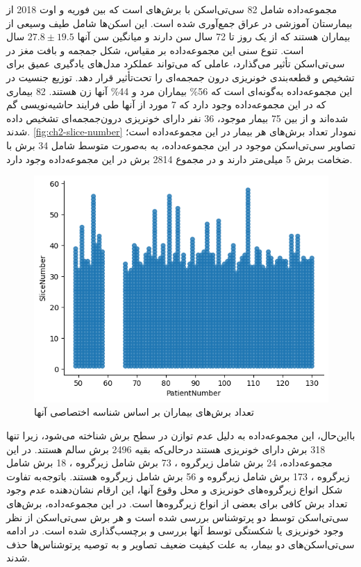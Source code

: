مجموعه‌داده 
 شامل 82 سی‌تی‌اسکن با برش‌‌های 
است که بین فوریه و اوت 2018 از بیمارستان آموزشی 
 در عراق جمع‌آوری شده است. این اسکن‌ها شامل طیف وسیعی از بیماران هستند که از یک روز تا 72 سال سن دارند و میانگین سن آنها 
 $27.8 \pm 19.5$
 سال است. تنوع سنی این مجموعه‌داده بر مقیاس، شکل جمجمه و بافت مغز در سی‌تی‌اسکن تأثیر می‌گذارد، عاملی که می‌تواند عملکرد مدل‌های یادگیری عمیق برای تشخیص و قطعه‌بندی خونریزی درون جمجمه‌ای را تحت‌تأثیر قرار دهد. توزیع جنسیت در این مجموعه‌داده به‌گونه‌ای است که 56\%  بیماران مرد و 44\% آنها زن هستند.
82 بیماری که در این مجموعه‌داده وجود دارد که 7 مورد از آنها طی فرایند حاشیه‌نویسی گم شده‌اند و از بین 75 بیمار موجود، 36 نفر دارای خونریزی درون‌جمجمه‌ای تشخیص داده شدند.
\autoref{fig:ch2-slice-number}
نمودار تعداد برش‌های هر بیمار در این مجموعه‌داده است؛ تصاویر سی‌تی‌اسکن موجود در این مجموعه‌داده،  به به‌صورت متوسط شامل 34 برش با ضخامت برش 5 میلی‌متر دارند و در مجموع 2814 برش در این مجموعه‌داده وجود دارد. 
\begin{figure}[h]
\centering
\includegraphics[width=1.0\linewidth]{"Images/Chapter2/Slice number"}
\caption{‌تعداد برش‌های بیماران بر اساس شناسه اختصاصی آنها}
\label{fig:ch2-slice-number}
\end{figure}

بااین‌حال، این مجموعه‌داده به دلیل عدم توازن در سطح برش شناخته می‌شود، زیرا تنها 318 برش دارای خونریزی هستند درحالی‌که  بقیه 2496 برش سالم هستند. در این مجموعه‌داده، 24 برش شامل زیرگروه
 ،
  73 برش شامل زیرگروه
 ، 
  18 برش شامل زیرگروه
 ،
173 برش شامل زیرگروه
 و 56 برش شامل زیرگروه 
هستند. باتوجه‌به تفاوت شکل انواع زیرگروه‌های خونریزی و محل وقوع آنها، این ارقام نشان‌دهنده عدم وجود تعداد برش کافی برای بعضی از انواع زیرگروه‌ها است.
در این مجموعه‌داده، برش‌های سی‌تی‌اسکن توسط دو پرتوشناس بررسی شده است و هر برش سی‌تی‌اسکن از نظر وجود خونریزی یا شکستگی توسط آنها بررسی و برچسب‌گذاری شده است. در ادامه سی‌تی‌اسکن‌های دو بیمار، به علت کیفیت ضعیف تصاویر و به توصیه پرتوشناس‌ها حذف شدند\cite{kyung2022improved}.

